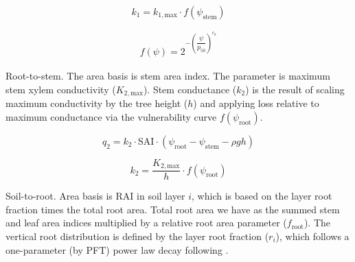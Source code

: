 \documentclass[draft,linenumbers]{agujournal}
\begin{document}
\begin{linenomath*} \begin{equation}
k_{1} = k_{1,\text{max}} \cdot f\left(\psi_{\text{stem}}\right)
\end{equation} \end{linenomath*}

\begin{linenomath*} \begin{equation} \begin{aligned}
f\left(\psi\right)=2^{-\left(\dfrac{\psi}{p_{50}}\right)^{c_k}}
\end{aligned} \end{equation} \end{linenomath*}

Root-to-stem. The area basis is stem area index. 
The parameter is maximum stem xylem conductivity ($K_{2,\text{max}}$).
Stem conductance ($k_2$) is the result of scaling maximum conductivity by the tree height ($h$)
and applying loss relative to maximum conductance via the vulnerability curve $f\left(\psi_{\text{root}}\right)$. 
\begin{linenomath*} \begin{equation}
q_2 = k_2 \cdot  \text{SAI}  \cdot \left( \psi_{\text{root}}-\psi_{\text{stem}}-\rho g h\right)
\end{equation} \end{linenomath*}
\begin{linenomath*} \begin{equation}
k_2 = \dfrac{K_{2,\text{max}}}{h} \cdot f\left(\psi_{\text{root}}\right)
\end{equation} \end{linenomath*}

Soil-to-root. Area basis is RAI in soil layer $i$, which is based on the layer root fraction times the
total root area. Total root area we have as the summed stem and leaf area indices multiplied by a relative
root area parameter ($f_{\text{root}}$).
The vertical root distribution is defined by the layer root fraction ($r_i$), which follows a one-parameter 
(by PFT) power law decay following \citet{jackson1996}.
\end{document}
